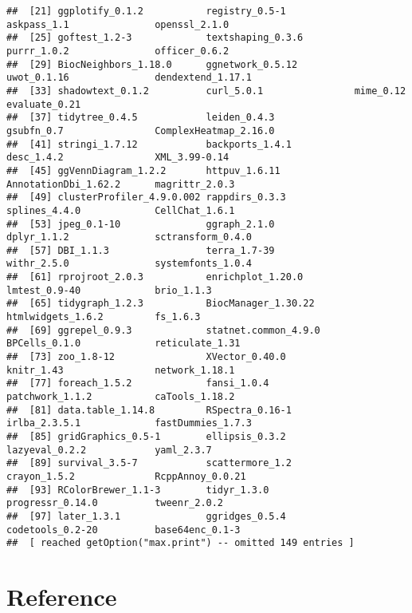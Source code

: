 \documentclass[
]{article}
\begin{document}
\begin{verbatim}
##  [21] ggplotify_0.1.2           registry_0.5-1            askpass_1.1               openssl_2.1.0            
##  [25] goftest_1.2-3             textshaping_0.3.6         purrr_1.0.2               officer_0.6.2            
##  [29] BiocNeighbors_1.18.0      ggnetwork_0.5.12          uwot_0.1.16               dendextend_1.17.1        
##  [33] shadowtext_0.1.2          curl_5.0.1                mime_0.12                 evaluate_0.21            
##  [37] tidytree_0.4.5            leiden_0.4.3              gsubfn_0.7                ComplexHeatmap_2.16.0    
##  [41] stringi_1.7.12            backports_1.4.1           desc_1.4.2                XML_3.99-0.14            
##  [45] ggVennDiagram_1.2.2       httpuv_1.6.11             AnnotationDbi_1.62.2      magrittr_2.0.3           
##  [49] clusterProfiler_4.9.0.002 rappdirs_0.3.3            splines_4.4.0             CellChat_1.6.1           
##  [53] jpeg_0.1-10               ggraph_2.1.0              dplyr_1.1.2               sctransform_0.4.0        
##  [57] DBI_1.1.3                 terra_1.7-39              withr_2.5.0               systemfonts_1.0.4        
##  [61] rprojroot_2.0.3           enrichplot_1.20.0         lmtest_0.9-40             brio_1.1.3               
##  [65] tidygraph_1.2.3           BiocManager_1.30.22       htmlwidgets_1.6.2         fs_1.6.3                 
##  [69] ggrepel_0.9.3             statnet.common_4.9.0      BPCells_0.1.0             reticulate_1.31          
##  [73] zoo_1.8-12                XVector_0.40.0            knitr_1.43                network_1.18.1           
##  [77] foreach_1.5.2             fansi_1.0.4               patchwork_1.1.2           caTools_1.18.2           
##  [81] data.table_1.14.8         RSpectra_0.16-1           irlba_2.3.5.1             fastDummies_1.7.3        
##  [85] gridGraphics_0.5-1        ellipsis_0.3.2            lazyeval_0.2.2            yaml_2.3.7               
##  [89] survival_3.5-7            scattermore_1.2           crayon_1.5.2              RcppAnnoy_0.0.21         
##  [93] RColorBrewer_1.1-3        tidyr_1.3.0               progressr_0.14.0          tweenr_2.0.2             
##  [97] later_1.3.1               ggridges_0.5.4            codetools_0.2-20          base64enc_0.1-3          
##  [ reached getOption("max.print") -- omitted 149 entries ]
\end{verbatim}

\hypertarget{bibliography}{%
\section*{Reference}\label{bibliography}}
\end{document}
